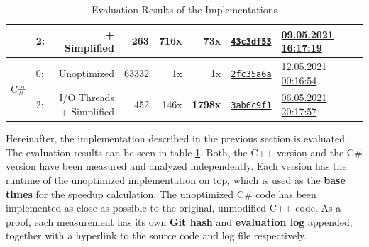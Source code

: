 \begin{table}[bt]
\begin{tabularx}{\textwidth}{clrrrrcX}
        \cmidrule{2-8}
        
        &
        2: &
        + Simplified &
        \textbf{263} &
        \textbf{716x} &
        73x &
        \href{https://se-gitlab.inf.tu-dresden.de/FLWilke/cds-s-2021/-/blob/43c3df53ecea64e10961dca8c41823ed766cba4c/tasks/mopp-2017-t3-mandelbrot-set/mandelbrot.cpp}{\texttt{43c3df53}} &
        \href{https://cds-lab.pages.se-gitlab.inf.tu-dresden.de/cds-s-2021/cds-website/logs/c75cb293de1ed36a6bb94494fd0b3b8f3b23c2290f5a165617ce8b8dc5681fe8/2021-05-09T16:17:19+02:00.html}{09.05.2021 16:17:19} \\
        
        \midrule
        
        \multirow{2}{*}[-1em]{C\#} &
        0: &
        Unoptimized &
        63332 &
        1x &
        1x &
        \href{https://se-gitlab.inf.tu-dresden.de/FLWilke/cds-s-2021/-/blob/2fc35a6adcf1e26c341b9d8979d035154efd6b5f/tasks/mopp-2017-t3-mandelbrot-set-c\%23-unoptimized/Program.cs}{\texttt{2fc35a6a}} &
        \href{https://cds-lab.pages.se-gitlab.inf.tu-dresden.de/cds-s-2021/cds-website/logs/c75cb293de1ed36a6bb94494fd0b3b8f3b23c2290f5a165617ce8b8dc5681fe8/2021-05-12T00:16:54+02:00.html}{12.05.2021 00:16:54} \\
        
        \cmidrule{2-8}
        
        &
        2: &
        \makecell{I/O Threads \\+ Simplified} &
        452 &
        146x &
        \textbf{1798x} &
        \href{https://se-gitlab.inf.tu-dresden.de/FLWilke/cds-s-2021/-/blob/3ab6c9f1111b224f0546b0ccb107a86ab7786720/tasks/mopp-2017-t3-mandelbrot-set-c\%23/Program.cs}{\texttt{3ab6c9f1}} &
        \href{https://cds-lab.pages.se-gitlab.inf.tu-dresden.de/cds-s-2021/cds-website/logs/c75cb293de1ed36a6bb94494fd0b3b8f3b23c2290f5a165617ce8b8dc5681fe8/2021-05-06T20:17:57+02:00.html}{06.05.2021 20:17:57} \\
        
        \bottomrule
    \end{tabularx}
    \caption{Evaluation Results of the Implementations}
    \label{tab:evaluation-results}
\end{table}

Hereinafter, the implementation described in the previous section is evaluated. The evaluation results can be seen in table \ref{tab:evaluation-results}. Both, the C++ version and the C\# version have been measured and analyzed independently. Each version has the runtime of the unoptimized implementation on top, which is used as the \textbf{base times} for the speedup calculation. The unoptimized C\# code has been implemented as close as possible to the original, unmodified C++ code. As a proof, each measurement has its own \textbf{Git hash} and \textbf{evaluation log} appended, together with a hyperlink to the source code and log file respectively.

